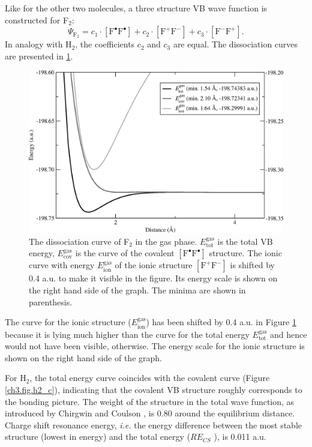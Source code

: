 Like for the other two molecules, a three structure VB wave function is constructed for F$_2$:
\begin{equation}
\nonumber
\Psi_{\mathrm{F_2}} = c_1\cdot [\mathrm{F}^\bullet \mathrm{F}^\bullet] + c_2 \cdot [\mathrm{F}^{+}\mathrm{F}^{-}] + c_3 \cdot [\mathrm{F}^{-}\mathrm{F}^{+}]. 
\end{equation}
In analogy with H$_2$, the coefficients $c_2$ and $c_3$ are equal. The dissociation curves are presented in \ref{ch3.fig.f2_c}.
\begin{figure}[hbtp]
\begin{center}
\includegraphics[scale=0.6]{dissociation/figures/f2_g.eps}
\end{center}
\caption{The dissociation curve of F$_2$ in the gas phase. $E_\mathrm{tot}^\mathrm{gas}$ is the total VB energy, $E_\mathrm{cov}^\mathrm{gas}$ is the curve of the covalent $[\mathrm{F^\bullet F^\bullet}]$ structure. The ionic curve with energy $E_\mathrm{ion}^\mathrm{gas}$ of the ionic structure  $[\mathrm{F}^{+}\mathrm{F}^{-}]$ is shifted by 0.4 a.u. to make it visible in the figure. Its energy scale is shown on the right hand side of the graph. The minima are shown in parenthesis.}
\label{ch3.fig.f2_c}
\end{figure}
The curve for the ionic structure ($E_\mathrm{ion}^\mathrm{gas}$) has been shifted by 0.4 a.u. in Figure \ref{ch3.fig.f2_c} because it is lying much higher than the curve for the total energy $E_\mathrm{tot}^\mathrm{gas}$ and hence would not have been visible, otherwise. The energy scale for the ionic structure is shown on the right hand side of the graph.

For H$_2$, the total energy curve coincides with the covalent curve (Figure \ref{ch3.fig.h2_c}), indicating that the covalent VB structure roughly corresponds to the bonding picture. The weight of the structure in the total wave function, as introduced by Chirgwin and Coulson \cite{chirgwin}, is 0.80 around the equilibrium distance. Charge shift resonance energy, \textit{i.e.} the energy difference between the most stable structure (lowest in energy) and the total energy ($RE_{CS}$ \cite{cs1}), is 0.011 a.u. 

